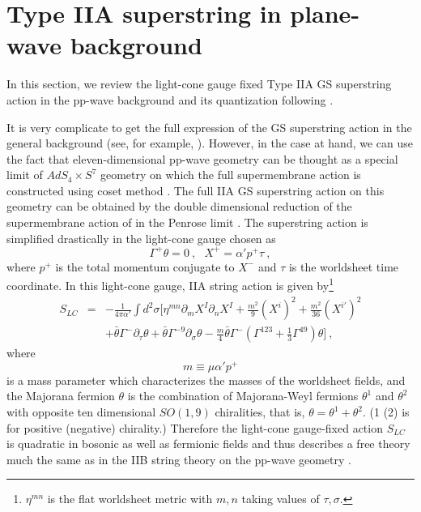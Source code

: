 \documentclass[a4paper,12pt]{article}
\numberwithin{equation}{section}
\begin{document}
\section{Type IIA superstring in plane-wave background}
\label{string}

In this section, we review the light-cone gauge fixed Type IIA GS
superstring action in the pp-wave background and its quantization
following \cite{hyu074,hyu158}.

It is very complicate to get the full expression of the GS superstring
action in the general background (see, for example,
\cite{cve202,hyu247}).  However, in the case at hand, we can use the
fact that eleven-dimensional pp-wave geometry can be thought as a
special limit of $AdS_4 \times S^7$ geometry on which the full
supermembrane action is constructed using coset method \cite{dew209}.
The full IIA GS superstring action on this geometry can be obtained by
the double dimensional reduction \cite{duf70} of the supermembrane
action of \cite{dew209} in the Penrose limit \cite{pen271}.  The
superstring action is simplified drastically in the light-cone gauge
chosen as
\begin{equation}
\Gamma^+ \theta = 0 ~,~~~
X^+ = \alpha' p^+  \tau ~,
\label{kfix}
\end{equation}
where $p^+$ is the total momentum conjugate to $X^-$ and $\tau$ is the
worldsheet time coordinate.  In this light-cone gauge, IIA string
action is given by\footnote{$\eta^{mn}$ is the flat worldsheet metric
  with $m,n$ taking values of $\tau,\sigma$.}
\begin{eqnarray}
S_{LC}
 &=& - \frac{1}{4 \pi \alpha'} \int  d^2 \sigma
 \Bigg[ \eta^{mn} \partial_m X^I \partial_n X^I
      + \frac{m^2}{9} (X^i)^2
      + \frac{m^2}{36} (X^{i'})^2
                       \nonumber \\
 & & + \bar{\theta} \Gamma^- \partial_\tau \theta
     + \bar{\theta} \Gamma^{-9} \partial_\sigma \theta
     - \frac{m}{4} \bar{\theta} \Gamma^-
        \left( \Gamma^{123} + \frac{1}{3} \Gamma^{49} \right)
        \theta
  \Bigg] ~,
\end{eqnarray}
where
\begin{equation}
m\equiv \mu \alpha' p^+
\end{equation}
is a mass parameter which characterizes the masses of the worldsheet
fields, and the Majorana fermion $\theta$ is the combination of
Majorana-Weyl fermions $\theta^1$ and $\theta^2$ with opposite ten
dimensional $SO(1,9)$ chiralities, that is, $\theta = \theta^1 +
\theta^2$. (1 (2) is for positive (negative) chirality.)  Therefore
the light-cone gauge-fixed action $S_{LC}$ is quadratic in bosonic as
well as fermionic fields and thus describes a free theory much the
same as in the IIB string theory \cite{met044} on the pp-wave geometry
\cite{bla242}.
\end{document}
